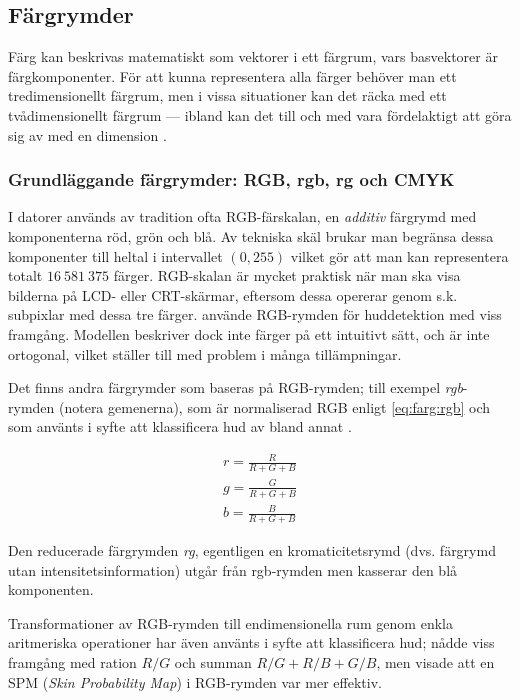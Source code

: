 \documentclass[../rapport_MVEX01-11-05]{subfiles}
\begin{document}
\subsection{Färgrymder}

Färg kan beskrivas matematiskt som vektorer i ett färgrum, vars
basvektorer är färgkomponenter. För att kunna representera alla färger
behöver man ett tredimensionellt färgrum, men i vissa situationer kan
det räcka med ett tvådimensionellt färgrum --- ibland kan det till och
med vara fördelaktigt att göra sig av med en dimension \cite{Kakumanu07}.

\subsubsection{Grundläggande färgrymder: RGB, rgb, rg och CMYK}

I datorer används av tradition ofta RGB-färskalan, en \emph{additiv}
färgrymd med komponenterna röd, grön och blå. Av tekniska skäl brukar
man begränsa dessa komponenter till heltal i intervallet $(0,255)$
vilket gör att man kan representera totalt $16\:581\:375$ färger.
RGB-skalan är mycket praktisk när man ska visa bilderna på LCD- eller
CRT-skärmar, eftersom dessa opererar genom s.k. subpixlar med dessa
tre färger.  använde RGB-rymden för huddetektion
med viss framgång. Modellen beskriver dock inte färger på ett
intuitivt sätt, och är inte ortogonal, vilket ställer till med problem
i många tillämpningar.

Det finns andra färgrymder som baseras på RGB-rymden; till exempel
\emph{rgb}-rymden (notera gemenerna), som är normaliserad RGB enligt
\eqref{eq:farg:rgb} och som använts i syfte att klassificera hud av bland
annat .

\begin{equation}
  \label{eq:farg:rgb}
  \begin{gathered}
  r = \frac{R}{R+G+B} \\
  g = \frac{G}{R+G+B} \\
  b = \frac{B}{R+G+B}
  \end{gathered}
\end{equation}

Den reducerade färgrymden \emph{rg}, egentligen en kromaticitetsrymd
(dvs. färgrymd utan intensitetsinformation) utgår från rgb-rymden men
kasserar den blå komponenten.

Transformationer av RGB-rymden till endimensionella rum genom enkla
aritmeriska operationer har även använts i syfte att klassificera hud;
 nådde viss framgång med ration $R/G$ och summan
$R/G+R/B+G/B$, men visade att en SPM (\emph{Skin Probability Map}) i
RGB-rymden var mer effektiv.
\end{document}

